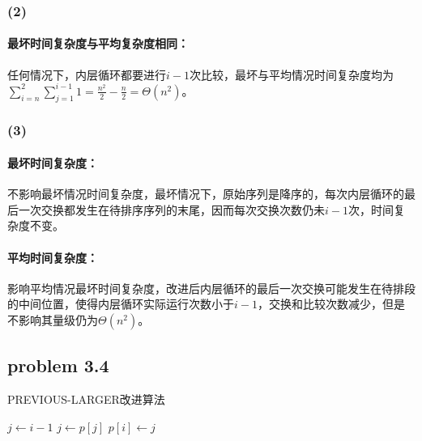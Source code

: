 \documentclass[11pt]{ctexart}
\begin{document}
	\subsubsection*{(2)}
	\paragraph{最坏时间复杂度与平均复杂度相同：}
	任何情况下，内层循环都要进行$i-1$次比较，最坏与平均情况时间复杂度均为$\sum_{i=n}^2\sum_{j=1}^{i-1}1=\frac{n^2}{2}-\frac{n}{2}=\Theta(n^2)$。
	\subsubsection*{(3)}
	\paragraph{最坏时间复杂度：}不影响最坏情况时间复杂度，最坏情况下，原始序列是降序的，每次内层循环的最后一次交换都发生在待排序序列的末尾，因而每次交换次数仍未$i-1$次，时间复杂度不变。
	\paragraph{平均时间复杂度：}影响平均情况最坏时间复杂度，改进后内层循环的最后一次交换可能发生在待排段的中间位置，使得内层循环实际运行次数小于$i-1$，交换和比较次数减少，但是不影响其量级仍为$\Theta(n^2)$。
	\newpage
	\subsection*{problem 3.4}
	\begin{algorithm}
		\caption{PREVIOUS-LARGER改进算法}
		\label{previous}
		\begin{algorithmic}[1]
			\State $j \gets i-1$
			\State $j \gets p[j]$
			\EndWhile
			\State $p[i]\gets j$
			\EndFor
			\State {}
			\EndFunction
		\end{algorithmic}
	\end{algorithm}
\end{document}
